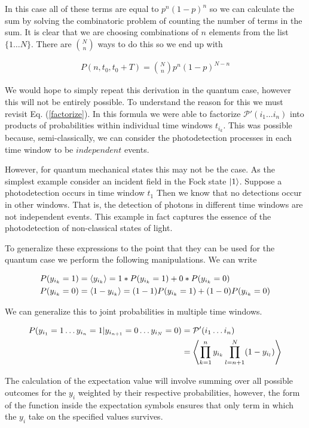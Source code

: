 \documentclass[12pt]{article}
\begin{document}
In this case all of these terms are equal to $p^n(1-p)^n$ so we can calculate the sum by solving the combinatoric problem of counting the number of terms in the sum. It is clear that we are choosing combinations of $n$ elements from the list $\{1 \ldots N\}$. There are $\binom{N}{n}$ ways to do this so we end up with

\begin{align}
P(n,t_0,t_0+T) = \binom{N}{n} p^n (1-p)^{N-n}
\end{align}

We would hope to simply repeat this derivation in the quantum case, however this will not be entirely possible. To understand the reason for this we must revisit Eq. (\ref{factorize}). In this formula we were able to factorize $\mathcal{P}'(i_1 \ldots i_n)$ into products of probabilities within individual time windows $t_{i_k}$. This was possible because, semi-classically, we can consider the photodetection processes in each time window to be $\textit{independent}$ events. 

However, for quantum mechanical states this may not be the case. As the simplest example consider an incident field in the Fock state $\ket{1}$. Suppose a photodetection occurs in time window $t_1$ Then we know that no detections occur in other windows. That is, the detection of photons in different time windows are not independent events. This example in fact captures the essence of the photodetection of non-classical states of light.

To generalize these expressions to the point that they can be used for the quantum case we perform the following manipulations. We can write

\begin{align}
P(y_{i_k} = 1) &= \Braket{y_{i_k}} = 1*P(y_{i_k}=1) + 0*P(y_{i_k}=0)\\
P(y_{i_k} = 0) &= \Braket{1-y_{i_k}} = (1-1)P(y_{i_k}=1) + (1-0)P(y_{i_k}=0)
\end{align}

We can generalize this to joint probabilities in multiple time windows.

\begin{align}
P(y_{i_1}=1 \ldots y_{i_n}=1 | y_{i_{n+1}}=0 \ldots y_{i_N}=0) &= \mathcal{P}'(i_1 \ldots i_n)\\
&= \Braket{\prod_{k=1}^n y_{i_k} \prod_{l=n+1}^{N} (1-y_{i_l})} \label{Pprime}
\end{align}

The calculation of the expectation value will involve summing over all possible outcomes for the $y_i$ weighted by their respective probabilities, however, the form of the function inside the expectation symbols ensures that only term in which the $y_i$ take on the specified values survives.
\end{document}
